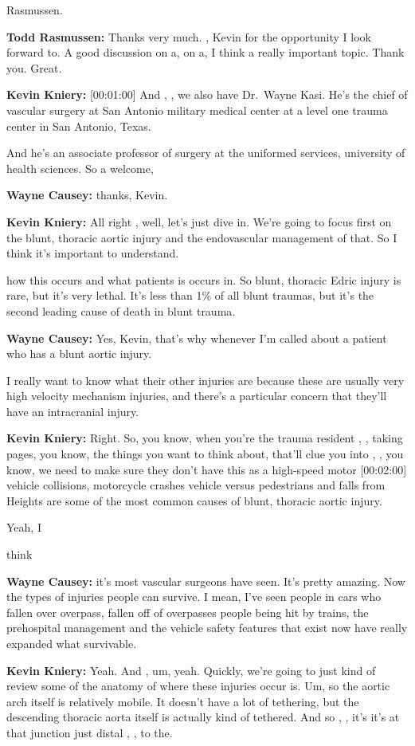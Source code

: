 \documentclass[
]{book}
\begin{document}
Rasmussen.

\textbf{Todd Rasmussen:} Thanks very much. , Kevin for the opportunity I look
forward to. A good discussion on a, on a, I think a really important
topic. Thank you. Great.

\textbf{Kevin Kniery:} {[}00:01:00{]} And , , we also have Dr.~Wayne Kasi. He's
the chief of vascular surgery at San Antonio military medical center at
a level one trauma center in San Antonio, Texas.

And he's an associate professor of surgery at the uniformed services,
university of health sciences. So a welcome,

\textbf{Wayne Causey:} thanks, Kevin.

\textbf{Kevin Kniery:} All right , well, let's just dive in. We're going to
focus first on the blunt, thoracic aortic injury and the endovascular
management of that. So I think it's important to understand.

how this occurs and what patients is occurs in. So blunt, thoracic Edric
injury is rare, but it's very lethal. It's less than 1\% of all blunt
traumas, but it's the second leading cause of death in blunt trauma.

\textbf{Wayne Causey:} Yes, Kevin, that's why whenever I'm called about a
patient who has a blunt aortic injury.

I really want to know what their other injuries are because these are
usually very high velocity mechanism injuries, and there's a particular
concern that they'll have an intracranial injury.

\textbf{Kevin Kniery:} Right. So, you know, when you're the trauma resident ,
, taking pages, you know, the things you want to think about, that'll
clue you into , , you know, we need to make sure they don't have this as
a high-speed motor {[}00:02:00{]} vehicle collisions, motorcycle crashes
vehicle versus pedestrians and falls from Heights are some of the most
common causes of blunt, thoracic aortic injury.

Yeah, I

think

\textbf{Wayne Causey:} it's most vascular surgeons have seen. It's pretty
amazing. Now the types of injuries people can survive. I mean, I've seen
people in cars who fallen over overpass, fallen off of overpasses people
being hit by trains, the prehospital management and the vehicle safety
features that exist now have really expanded what survivable.

\textbf{Kevin Kniery:} Yeah. And , um, yeah. Quickly, we're going to just
kind of review some of the anatomy of where these injuries occur is. Um,
so the aortic arch itself is relatively mobile. It doesn't have a lot of
tethering, but the descending thoracic aorta itself is actually kind of
tethered. And so , , it's it's at that junction just distal , , to the.
\end{document}

